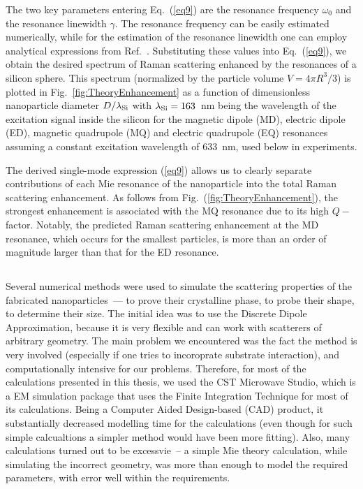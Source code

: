         The two key parameters entering Eq.~(\ref{eq9}) are the resonance frequency $\omega_0$ and the resonance linewidth $\gamma$.
        The resonance frequency can be easily estimated numerically, while for the estimation of the resonance linewidth one can
        employ analytical expressions from Ref.~\cite{lai1991effect}. Substituting these values into Eq.~(\ref{eq9}), we obtain the desired
        spectrum of Raman scattering enhanced by the resonances of a silicon sphere. This spectrum (normalized by the particle
        volume $V=4\pi R^3/3$) is plotted in Fig.~\ref{fig:TheoryEnhancement} as a  function of dimensionless nanoparticle diameter $D/\lambda_{\rm Si}$
        with $\lambda_{\rm Si}=163$~nm being the wavelength of the excitation signal inside the silicon for the magnetic dipole (MD), electric dipole (ED),
        magnetic quadrupole (MQ) and electric quadrupole (EQ) resonances assuming a constant excitation wavelength of 633~nm,
        used below in experiments.

        The derived single-mode expression (\ref{eq9}) allows us to clearly separate contributions of each Mie resonance of the
        nanoparticle into the total Raman scattering enhancement. As follows from Fig.~(\ref{fig:TheoryEnhancement}), the strongest enhancement
        is associated with the MQ resonance due to its high $Q-$factor. Notably, the predicted Raman scattering enhancement
        at the MD resonance, which occurs for the smallest particles, is more than an order of magnitude larger than that for
        the ED resonance.


    \subsection{}
    \label{sec:Numeric}
        Several numerical methods were used to simulate the scattering properties of the fabricated nanoparticles~--- to prove their
        crystalline phase, to probe their shape, to determine their size. The initial idea was to use the Discrete Dipole Approximation,
        because it is very flexible and can work with scatterers of arbitrary geometry. The main problem we encountered was the fact
        the method is very involved (especially if one tries to incoroprate substrate interaction), and computationally intensive for
        our problems. Therefore, for most of the calculations presented in this thesis, we used the CST Microwave Studio, which is a
        EM simulation package that uses the Finite Integration Technique for most of its calculations. Being a Computer Aided Design-based (CAD) product,
        it substantially decreased modelling time for the calculations (even though for such simple calcualtions a simpler
        method would have been more fitting). Also, many calculations turned out to be excessvie~-- a simple Mie theory calculation,
        while simulating the incorrect geometry, was more than enough to model the required parameters, with error well within the
        requirements.

